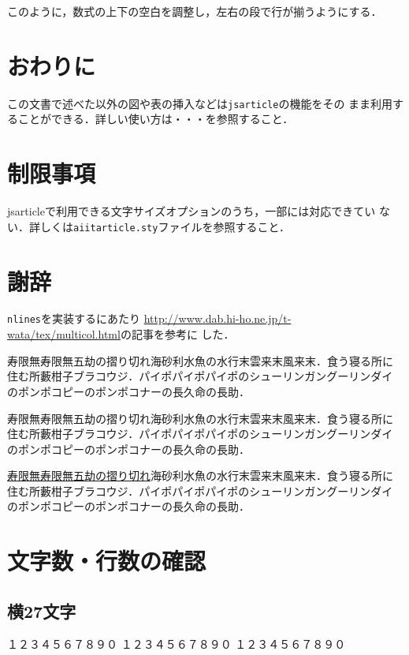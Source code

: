 \documentclass[a4j, 12Q, twocolumn, twoside, draft]{jsarticle}
\newcommand{\cmd}[1]{\texttt{\symbol{"5C}#1}} %
\begin{document}

このように，数式の上下の空白を調整し，左右の段で行が揃うようにする．


 \section{おわりに}
この文書で述べた以外の図や表の挿入などは\texttt{jsarticle}の機能をその
まま利用することができる．詳しい使い方は・・・を参照すること．
\section{制限事項}
jsarticleで利用できる文字サイズオプションのうち，一部には対応できてい
ない．詳しくは\texttt{aiitarticle.sty}ファイルを参照すること．

\section{謝辞}
\cmd{nlines}を実装するにあたり
\url{http://www.dab.hi-ho.ne.jp/t-wata/tex/multicol.html}の記事を参考に
した．


寿限無寿限無五劫の摺り切れ海砂利水魚の水行末雲来末風来末．食う寝る所に
住む所藪柑子ブラコウジ．パイポパイポパイポのシューリンガングーリンダイ
のポンポコピーのポンポコナーの長久命の長助．

寿限無寿限無五劫の摺り切れ海砂利水魚の水行末雲来末風来末．食う寝る所に
住む所藪柑子ブラコウジ．パイポパイポパイポのシューリンガングーリンダイ
のポンポコピーのポンポコナーの長久命の長助．

\underline{寿限無寿限無五劫の摺り切れ}海砂利水魚の水行末雲来末風来末．食う寝る所に
住む所藪柑子ブラコウジ．パイポパイポパイポのシューリンガングーリンダイ
のポンポコピーのポンポコナーの長久命の長助．


\clearpage
\appendix
\section{文字数・行数の確認}
\subsection{横27文字}
\noindent
１２３４５６７８９０
１２３４５６７８９０
１２３４５６７８９０
\end{document}
